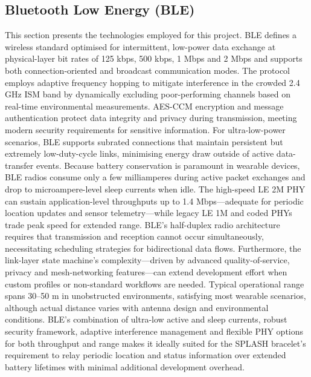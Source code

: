 \subsection{Bluetooth Low Energy (BLE)}
This section presents the technologies employed for this project. \ac{BLE} defines a wireless standard optimised for intermittent, low-power data exchange at physical-layer bit rates of 125 kbps, 500 kbps, 1 Mbps and 2 Mbps and supports both connection-oriented and broadcast communication modes. The protocol employs adaptive frequency hopping to mitigate interference in the crowded 2.4 \ac{GHz} ISM band by dynamically excluding poor-performing channels based on real-time environmental measurements. \ac{AES}-CCM encryption and message authentication protect data integrity and privacy during transmission, meeting modern security requirements for sensitive information. For ultra-low-power scenarios, \ac{BLE} supports subrated connections that maintain persistent but extremely low-duty-cycle links, minimising energy draw outside of active data-transfer events.  
Because battery conservation is paramount in wearable devices, \ac{BLE} radios consume only a few milliamperes during active packet exchanges and drop to microampere-level sleep currents when idle. The high-speed LE 2M PHY can sustain application-level throughputs up to 1.4 \ac{Mbps}—adequate for periodic location updates and sensor telemetry—while legacy LE 1M and coded PHYs trade peak speed for extended range. \ac{BLE}’s half-duplex radio architecture requires that transmission and reception cannot occur simultaneously, necessitating scheduling strategies for bidirectional data flows. Furthermore, the link-layer state machine’s complexity—driven by advanced quality-of-service, privacy and mesh-networking features—can extend development effort when custom profiles or non-standard workflows are needed. Typical operational range spans 30–50 m in unobstructed environments, satisfying most wearable scenarios, although actual distance varies with antenna design and environmental conditions. \ac{BLE}’s combination of ultra-low active and sleep currents, robust security framework, adaptive interference management and flexible PHY options for both throughput and range makes it ideally suited for the SPLASH bracelet’s requirement to relay periodic location and status information over extended battery lifetimes with minimal additional development overhead\cite{bt_1}.

